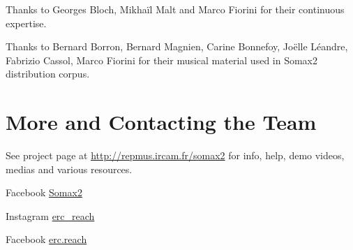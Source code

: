 


\vspace{5mm}

\noindent Thanks to Georges Bloch, Mikhaïl Malt and Marco Fiorini for their continuous expertise.


\noindent Thanks to Bernard Borron, Bernard Magnien, Carine Bonnefoy, Joëlle Léandre, Fabrizio Cassol, Marco Fiorini for their musical material used in Somax2 distribution corpus.

\section{More and Contacting the Team}

See project page at \url{http://repmus.ircam.fr/somax2} for info, help, demo videos, medias and various resources.

Facebook \href{https://www.facebook.com/profile.php?id=61552158505819}{Somax2}

Instagram \href{https://www.instagram.com/erc_reach/}{erc\_reach}

Facebook \href{https://www.facebook.com/erc.reach}{erc.reach}